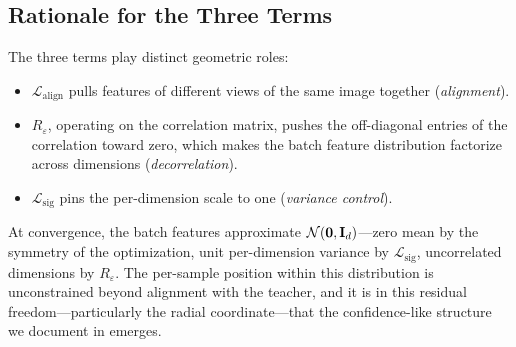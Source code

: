 \subsection{Rationale for the Three Terms}

The three terms play distinct geometric roles:
\begin{itemize}
    \item $\mathcal{L}_\text{align}$ pulls features of different views of the same image together (\emph{alignment}).
    \item $R_\varepsilon$, operating on the correlation matrix, pushes the off-diagonal entries of the correlation toward zero, which makes the batch feature distribution factorize across dimensions (\emph{decorrelation}).
    \item $\mathcal{L}_\text{sig}$ pins the per-dimension scale to one (\emph{variance control}).
\end{itemize}
At convergence, the batch features approximate $\mathcal{N}(\mathbf{0}, \mathbf{I}_d)$---zero mean by the symmetry of the optimization, unit per-dimension variance by $\mathcal{L}_\text{sig}$, uncorrelated dimensions by $R_\varepsilon$. The per-sample position within this distribution is unconstrained beyond alignment with the teacher, and it is in this residual freedom---particularly the radial coordinate---that the confidence-like structure we document in  emerges.
